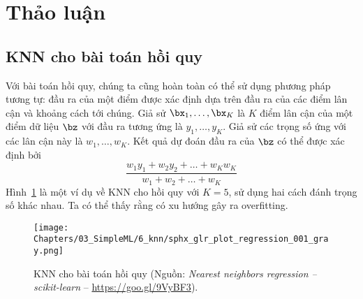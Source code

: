 \section{Thảo luận}



\subsection{KNN cho bài toán hồi quy}
Với bài toán hồi quy, chúng ta cũng hoàn toàn có thể sử dụng phương pháp
tương tự: đầu ra của một điểm được xác định dựa trên đầu ra của các điểm lân cận
và khoảng cách tới chúng. Giả sử $\bx_1, \dots, \bx_K$ là $K$ điểm lân cận của
một điểm dữ liệu $\bz$ với đầu ra tương ứng là $y_1, \dots, y_K$. Giả sử các
trọng số ứng với các lân cận này là $w_1, \dots, w_K$. Kết quả dự đoán
đầu ra của $\bz$ có thể được xác định bởi
\begin{equation}
\displaystyle
    \frac{w_1 y_1 + w_2 y_2 + \dots + w_Kw_K}{w_1 + w_2 + \dots + w_K}
\end{equation}
Hình~\ref{fig:6_knn_reg} là một ví dụ về KNN cho hồi quy với $K = 5$,
sử dụng hai cách đánh trọng số khác nhau. Ta có thể thấy rằng
 có xu hướng gây ra overfitting. 

\begin{figure}[t]
\centering
    \texttt{[image: Chapters/03\_SimpleML/6\_knn/sphx\_glr\_plot\_regression\_001\_gray.png]}
    \caption[]{KNN cho bài toán hồi quy (Nguồn:
    \textit{Nearest neighbors regression -- scikit-learn} -- \url{https://goo.gl/9VyBF3}).}
    \label{fig:6_knn_reg}
\end{figure}








